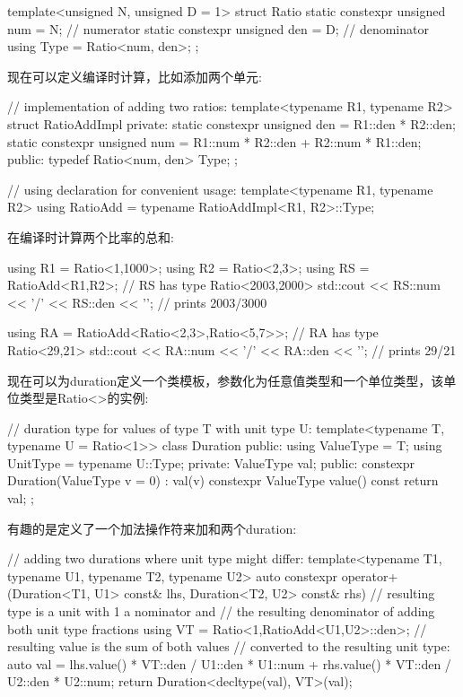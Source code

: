 \begin{cpp}
template<unsigned N, unsigned D = 1>
struct Ratio {
	static constexpr unsigned num = N; // numerator
	static constexpr unsigned den = D; // denominator
	using Type = Ratio<num, den>;
};
\end{cpp}

现在可以定义编译时计算，比如添加两个单元:

\begin{cpp}
// implementation of adding two ratios:
template<typename R1, typename R2>
struct RatioAddImpl
{
	private:
	static constexpr unsigned den = R1::den * R2::den;
	static constexpr unsigned num = R1::num * R2::den + R2::num * R1::den;
	public:
	typedef Ratio<num, den> Type;
};

// using declaration for convenient usage:
template<typename R1, typename R2>
using RatioAdd = typename RatioAddImpl<R1, R2>::Type;
\end{cpp}

在编译时计算两个比率的总和:

\begin{cpp}
using R1 = Ratio<1,1000>;
using R2 = Ratio<2,3>;
using RS = RatioAdd<R1,R2>; // RS has type Ratio<2003,2000>
std::cout << RS::num << '/' << RS::den << '\n'; // prints 2003/3000

using RA = RatioAdd<Ratio<2,3>,Ratio<5,7>>; // RA has type Ratio<29,21>
std::cout << RA::num << '/' << RA::den << '\n'; // prints 29/21
\end{cpp}

现在可以为duration定义一个类模板，参数化为任意值类型和一个单位类型，该单位类型是Ratio<>的实例:

\begin{cpp}
// duration type for values of type T with unit type U:
template<typename T, typename U = Ratio<1>>
class Duration {
	public:
	using ValueType = T;
	using UnitType = typename U::Type;
	private:
	ValueType val;
	public:
	constexpr Duration(ValueType v = 0)
	: val(v) {
	}
	constexpr ValueType value() const {
		return val;
	}
};
\end{cpp}

有趣的是定义了一个加法操作符来加和两个duration:

\begin{cpp}
// adding two durations where unit type might differ:
template<typename T1, typename U1, typename T2, typename U2>
auto constexpr operator+(Duration<T1, U1> const& lhs,
						 Duration<T2, U2> const& rhs)
{
	// resulting type is a unit with 1 a nominator and
	// the resulting denominator of adding both unit type fractions
	using VT = Ratio<1,RatioAdd<U1,U2>::den>;
	// resulting value is the sum of both values
	// converted to the resulting unit type:
	auto val = lhs.value() * VT::den / U1::den * U1::num +
				rhs.value() * VT::den / U2::den * U2::num;
	return Duration<decltype(val), VT>(val);
}
\end{cpp}

